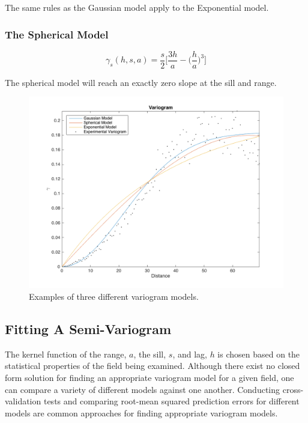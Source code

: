 The same rules as the Gaussian model apply to the Exponential model.

\subsubsection{The Spherical Model}

\begin{equation}
	\gamma_s(h, s, a) = \frac{s}{2} \Bigg[ \dfrac{3h}{a} - \Bigg( \dfrac{h}{a} \Bigg)^3 \Bigg]
	\label{eq:sph_model}
\end{equation}

The spherical model will reach an exactly zero slope at the sill and range.

\begin{figure}[htb!]
    \centering    
    \includegraphics[width=0.8\linewidth]{figures/fit_kern_comp.png}
    \ssp
    \caption{Examples of three different variogram models.}
    \label{fig:fit_kernel_cop}
\end{figure}

\subsection{Fitting A Semi-Variogram} \label{sec:varfit}
The kernel function of the range, $a$, the sill, $s$, and lag, $h$ is chosen based on the statistical properties of the field being examined. Although there exist no closed form solution for finding an appropriate variogram model for a given field, one can compare a variety of different models against one another. Conducting cross-validation tests and comparing root-mean squared prediction errors for different models are common approaches for finding appropriate variogram models.

